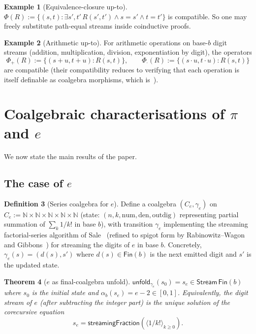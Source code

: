 \documentclass[12pt]{article}
\newtheorem{theorem}{Theorem}[section]
\theoremstyle{definition}
\newtheorem{definition}[theorem]{Definition}
\newtheorem{example}[theorem]{Example}
\theoremstyle{remark}
\newcommand{\N}{\mathbb{N}}
\newcommand{\Stream}{\mathsf{Stream}}
\newcommand{\unfold}{\mathsf{unfold}}
\begin{document}
\begin{example}[Equivalence-closure up-to]
$\Phi(R) := \{(s,t) : \exists s', t'\,R(s',t') \wedge s = s' \wedge t = t'\}$
is compatible. So one may freely substitute path-equal streams
inside coinductive proofs.
\end{example}

\begin{example}[Arithmetic up-to]
For arithmetic operations on base-$b$ digit streams (addition,
multiplication, division, exponentiation by digit), the operators
\[
\Phi_+(R) := \{(s+u, t+u) : R(s,t)\},\qquad
\Phi_\cdot(R) := \{(s\cdot u, t\cdot u) : R(s,t)\}
\]
are compatible (their compatibility reduces to verifying that
each operation is itself definable as coalgebra morphisms, which
is~\cite{ghani-hancock-pattinson}).
\end{example}

\section{\texorpdfstring{Coalgebraic characterisations of $\pi$ and $e$}{Coalgebraic characterisations of pi and e}}\label{sec:pi-e}

We now state the main results of the paper.

\subsection{\texorpdfstring{The case of $e$}{The case of e}}

\begin{definition}[Series coalgebra for $e$]\label{def:e-coalg}
Define a coalgebra $(C_e, \gamma_e)$ on
$C_e := \N \times \N \times \N \times \N \times \N$
(state: $(n, k, \mathrm{num}, \mathrm{den}, \mathrm{outdig})$
representing partial summation of $\sum_k 1/k!$ in base $b$),
with transition $\gamma_e$ implementing the streaming
factorial-series algorithm of Sale~\cite{sale-e-1968} (refined to
spigot form by Rabinowitz--Wagon~\cite{rabwagon-spigot} and Gibbons~\cite{gibbons-spigot})
for streaming the digits of $e$ in base $b$. Concretely,
$\gamma_e(s) = (d(s), s')$ where $d(s) \in \mathsf{Fin}(b)$ is the
next emitted digit and $s'$ is the updated state.
\end{definition}

\begin{theorem}[$e$ as final-coalgebra unfold]\label{thm:e-final}
$\unfold_{\gamma_e}(s_0) = s_e \in \Stream\,\mathsf{Fin}(b)$
where $s_0$ is the initial state and
$\alpha_b(s_e) = e - 2 \in [0,1]$. Equivalently, the digit stream
of $e$ (after subtracting the integer part) is the unique
solution of the corecursive equation
\[
s_e = \mathsf{streamingFraction}(\langle 1/k! \rangle_{k\geq 0}).
\]
\end{theorem}
\end{document}
